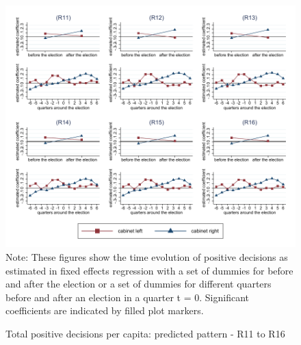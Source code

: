 \documentclass[11pt,a4paper]{scrartcl}
\begin{document}
\clearpage
\FloatBarrier
\begin{figure}[!ht]
	\caption{Total positive decisions per capita: predicted pattern - R11 to R16}
	\includegraphics[width=1\textwidth]{../results/decisions/log_totalpositive_pc_graphs_R11-R16.pdf}
	\scriptsize{Note: These figures show the time evolution of positive decisions as estimated in fixed effects regression with a set of dummies for before and after the election or a set of dummies for different quarters before and after an election in a quarter t = 0. Significant coefficients are indicated by filled plot markers.}
\end{figure}

\clearpage
\FloatBarrier




\clearpage
\FloatBarrier

\end{document}
